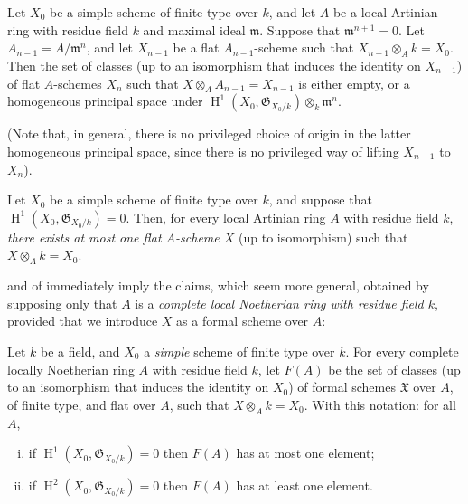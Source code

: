 \begin{corollary}\label{fga2-theorem-8-corollary-2}
    Let $X_0$ be a simple scheme of finite type over $k$, and let $A$ be a local Artinian ring with residue field $k$ and maximal ideal $\mathfrak{m}$.
    Suppose that $\mathfrak{m}^{n+1}=0$.
    Let $A_{n-1}=A/\mathfrak{m}^n$, and let $X_{n-1}$ be a flat $A_{n-1}$-scheme such that $X_{n-1}\otimes_Ak=X_0$.
    Then the set of classes (up to an isomorphism that induces the identity on $X_{n-1}$) of flat $A$-schemes $X_n$ such that $X\otimes_AA_{n-1}=X_{n-1}$ is either empty, or a homogeneous principal space under $\operatorname{H}^1(X_0,\mathfrak{G}_{X_0/k})\otimes_k\mathfrak{m}^n$.
\end{corollary}


(Note that, in general, there is no privileged choice of origin in the latter homogeneous principal space, since there is no privileged way of lifting $X_{n-1}$ to $X_n$).

\begin{corollary}\label{fga2-theorem-8-corollary-3}
    Let $X_0$ be a simple scheme of finite type over $k$, and suppose that $\operatorname{H}^1(X_0,\mathfrak{G}_{X_0/k})=0$.
    Then, for every local Artinian ring $A$ with residue field $k$, \emph{there exists at most one flat $A$-scheme $X$} (up to isomorphism) such that $X\otimes_Ak=X_0$.
\end{corollary}


 and  of  immediately imply the claims, which seem more general, obtained by supposing only that $A$ is a \emph{complete local Noetherian ring with residue field $k$}, provided that we introduce $X$ as a formal scheme over $A$:

\begin{theorem}\label{fga2-theorem-9}
    Let $k$ be a field, and $X_0$ a \emph{simple} scheme of finite type over $k$.
    For every complete locally Noetherian ring $A$ with residue field $k$, let $F(A)$ be the set of classes (up to an isomorphism that induces the identity on $X_0$) of formal schemes $\mathfrak{X}$ over $A$, of finite type, and flat over $A$, such that $X\otimes_Ak=X_0$.
    With this notation: for all $A$,

    \begin{enumerate}[i.]
        \item if $\operatorname{H}^1(X_0,\mathfrak{G}_{X_0/k})=0$ then $F(A)$ has at most one element;
        \item if $\operatorname{H}^2(X_0,\mathfrak{G}_{X_0/k})=0$ then $F(A)$ has at least one element.
    \end{enumerate}
\end{theorem}


